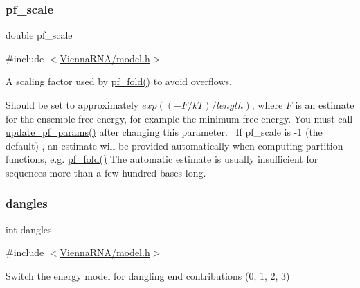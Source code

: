 \subsubsection{\texorpdfstring{pf\+\_\+scale}{pf\_scale}}
{\footnotesize\ttfamily double pf\+\_\+scale}



{\ttfamily \#include $<$\mbox{\hyperlink{model_8h}{Vienna\+R\+N\+A/model.\+h}}$>$}



A scaling factor used by \mbox{\hyperlink{group__pf__fold_gadc3db3d98742427e7001a7fd36ef28c2}{pf\+\_\+fold()}} to avoid overflows. 

Should be set to approximately $exp{((-F/kT)/length)}$, where $F$ is an estimate for the ensemble free energy, for example the minimum free energy. You must call \mbox{\hyperlink{group__pf__fold_ga384e927890f9c034ff09fa66da102d28}{update\+\_\+pf\+\_\+params()}} after changing this parameter.~\newline
If pf\+\_\+scale is -\/1 (the default) , an estimate will be provided automatically when computing partition functions, e.\+g. \mbox{\hyperlink{group__pf__fold_gadc3db3d98742427e7001a7fd36ef28c2}{pf\+\_\+fold()}} The automatic estimate is usually insufficient for sequences more than a few hundred bases long. \mbox{\label{group__model__details_ga72b511ed1201f7e23ec437e468790d74}} 
\subsubsection{\texorpdfstring{dangles}{dangles}}
{\footnotesize\ttfamily int dangles}



{\ttfamily \#include $<$\mbox{\hyperlink{model_8h}{Vienna\+R\+N\+A/model.\+h}}$>$}



Switch the energy model for dangling end contributions (0, 1, 2, 3) 

